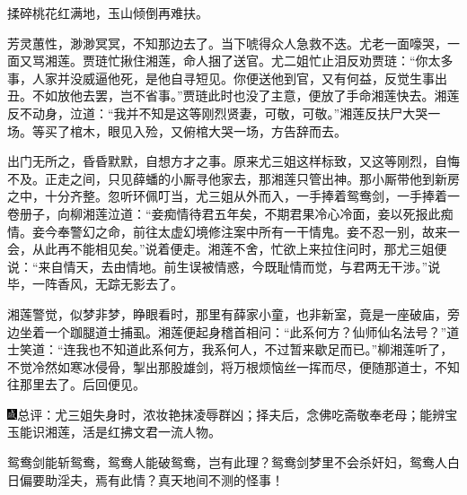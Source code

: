 揉碎桃花红满地，玉山倾倒再难扶。

芳灵蕙性，渺渺冥冥，不知那边去了。当下唬得众人急救不迭。尤老一面嚎哭，一面又骂湘莲。贾琏忙揪住湘莲，命人捆了送官。尤二姐忙止泪反劝贾琏：“你太多事，人家并没威逼他死，是他自寻短见。你便送他到官，又有何益，反觉生事出丑。不如放他去罢，岂不省事。”贾琏此时也没了主意，便放了手命湘莲快去。湘莲反不动身，泣道：“我并不知是这等刚烈贤妻，可敬，可敬。”湘莲反扶尸大哭一场。等买了棺木，眼见入殓，又俯棺大哭一场，方告辞而去。

出门无所之，昏昏默默，自想方才之事。原来尤三姐这样标致，又这等刚烈，自悔不及。正走之间，只见薛蟠的小厮寻他家去，那湘莲只管出神。那小厮带他到新房之中，十分齐整。忽听环佩叮当，尤三姐从外而入，一手捧着鸳鸯剑，一手捧着一卷册子，向柳湘莲泣道：“妾痴情待君五年矣，不期君果冷心冷面，妾以死报此痴情。妾今奉警幻之命，前往太虚幻境修注案中所有一干情鬼。妾不忍一别，故来一会，从此再不能相见矣。”说着便走。湘莲不舍，忙欲上来拉住问时，那尤三姐便说：“来自情天，去由情地。前生误被情惑，今既耻情而觉，与君两无干涉。”说毕，一阵香风，无踪无影去了。

湘莲警觉，似梦非梦，睁眼看时，那里有薛家小童，也非新室，竟是一座破庙，旁边坐着一个跏腿道士捕虱。湘莲便起身稽首相问：“此系何方？仙师仙名法号？”道士笑道：“连我也不知道此系何方，我系何人，不过暂来歇足而已。”柳湘莲听了，不觉冷然如寒冰侵骨，掣出那股雄剑，将万根烦恼丝一挥而尽，便随那道士，不知往那里去了。后回便见。

{\includegraphics[width=3mm]{../Images/00005}\kaishu 总评：尤三姐失身时，浓妆艳抹凌辱群凶；择夫后，念佛吃斋敬奉老母；能辨宝玉能识湘莲，活是红拂文君一流人物。}

{\kaishu 鸳鸯剑能斩鸳鸯，鸳鸯人能破鸳鸯，岂有此理？鸳鸯剑梦里不会杀奸妇，鸳鸯人白日偏要助淫夫，焉有此情？真天地间不测的怪事！}